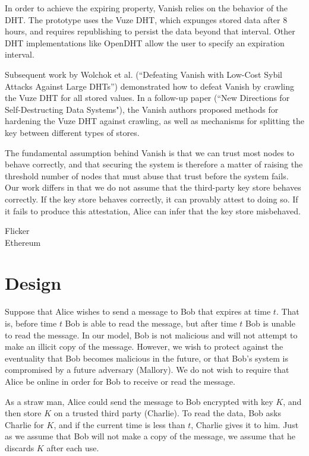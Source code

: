 \documentclass{article}
\begin{document}
In order to achieve the expiring property, Vanish relies on the behavior of the DHT. The prototype uses the Vuze DHT, which expunges stored data after 8 hours, and requires republishing to persist the data beyond that interval. Other DHT implementations like OpenDHT allow the user to specify an expiration interval.

Subsequent work by Wolchok et al. (``Defeating Vanish with Low-Cost Sybil Attacks Against Large DHTs'') demonstrated how to defeat Vanish by crawling the Vuze DHT for all stored values. In a follow-up paper (``New Directions for Self-Destructing Data Systems"), the Vanish authors proposed methods for hardening the Vuze DHT against crawling, as well as mechanisms for splitting the key between different types of stores.

The fundamental assumption behind Vanish is that we can trust most nodes to behave correctly, and that securing the system is therefore a matter of raising the threshold number of nodes that must abuse that trust before the system fails. Our work differs in that we do not assume that the third-party key store behaves correctly. If the key store behaves correctly, it can provably attest to doing so. If it fails to produce this attestation, Alice can infer that the key store misbehaved. 

Flicker\\

Ethereum\\

\section{Design}

Suppose that Alice wishes to send a message to Bob that expires at time $t$. That is, before time $t$ Bob is able to read the message, but after time $t$ Bob is unable to read the message. In our model, Bob is not malicious and will not attempt to make an illicit copy of the message. However, we wish to protect against the eventuality that Bob becomes malicious in the future, or that Bob's system is compromised by a future adversary (Mallory). We do not wish to require that Alice be online in order for Bob to receive or read the message.

As a straw man, Alice could send the message to Bob encrypted with key $K$, and then store $K$ on a trusted third party (Charlie). To read the data, Bob asks Charlie for $K$, and if the current time is less than $t$, Charlie gives it to him. Just as we assume that Bob will not make a copy of the message, we assume that he discards $K$ after each use.
\end{document}
